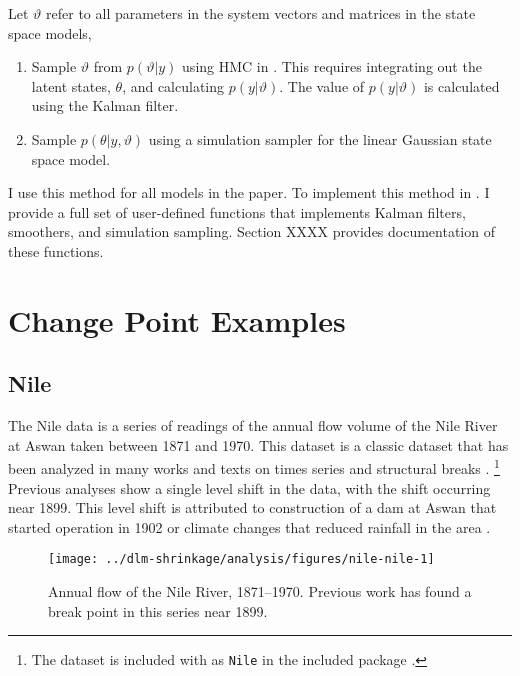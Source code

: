 Let $\vartheta$ refer to all parameters in the system vectors and matrices in the state space models,
\begin{enumerate}
\item Sample $\vartheta$ from $p(\vartheta | y)$ using HMC in \Stan{}.
  This requires integrating out the latent states, $\theta$, and calculating $p(y | \vartheta)$.
  The value of $p(y | \vartheta)$ is calculated using the Kalman filter.
\item Sample $p(\theta | y, \vartheta)$ using a simulation sampler for the linear Gaussian state space model.
\end{enumerate}
I use this method for all models in the paper. 
To implement this method in \Stan{}.
I provide a full set of user-defined \Stan{} functions that implements Kalman filters, smoothers, and simulation sampling.
Section XXXX provides documentation of these functions.



\section{Change Point Examples}
\label{dlm:sec:examples}


\subsection{Nile}
\label{dlm:sec:nile}

The Nile data is a series of readings of the annual flow volume of the Nile River at Aswan taken between 1871 and 1970.
This dataset is a classic dataset that has been analyzed in many works and texts on times series and structural breaks \parencites{Cobb1978}{Balke1993}{DeJongPenzer1998}{}{DurbinKoopman2012}{CommandeurKoopmanOoms2011}.%
\footnote{The dataset is included with \RLang{} as \texttt{Nile} in the included package .}
Previous analyses show a single level shift in the data, with the shift occurring near 1899.
This level shift is attributed to construction of a dam at Aswan that started operation in 1902 or climate changes that reduced rainfall in the area \parencite[278]{Cobb1978}.

\begin{figure}
  \centering
  \texttt{[image: ../dlm-shrinkage/analysis/figures/nile-nile-1]}
  \caption{Annual flow of the Nile River, 1871--1970. Previous work has found a break point in this series near 1899.}
  \label{dlm:fig:nile}
\end{figure}

